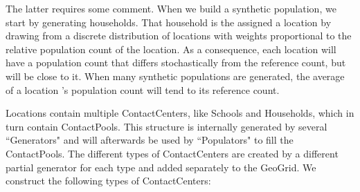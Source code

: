 The latter requires some comment. When we build a synthetic population, we start by generating households. That household is the assigned a location by drawing from a discrete distribution of locations with weights proportional to the  relative population count of the location. As a consequence, each location will have a population count that differs stochastically from the reference count, but will be close to it. When many synthetic populations are generated, the average of a location 's population count will tend to its reference count.

Locations contain multiple ContactCenters, like Schools and Households, which in turn contain ContactPools.
This structure is internally generated by several ``Generators" and will afterwards be used by ``Populators" to fill the ContactPools. The different types of ContactCenters are created by a different partial generator for each type and added separately to the GeoGrid. We construct the following types of ContactCenters:

